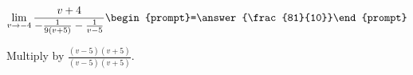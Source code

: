 \documentclass{ximera}
\author{Bart Snapp}
\begin{document}
\begin{exercise}

\[
\lim_{v\to -4 } \frac{v+4}{-\frac{1}{9 (v+5)}-\frac{1}{v-5}}  \begin{prompt}=\answer{\frac{81}{10}}\end{prompt}
\]
\begin{hint}
Multiply by $\frac{(v-5) (v+5)}{(v-5) (v+5)}$.
\end{hint}
\end{exercise}
\end{document}

